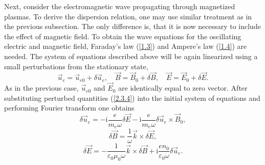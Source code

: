 Next, consider the electromagnetic wave propagating through magnetized plasmas. To derive the dispersion relation, one may use similar treatment as in the previous subsection. The only difference is, that it is now necessary to include the effect of magnetic field. To obtain the wave equations for the oscillating electric and magnetic field, Faraday's law (\ref{1.3}) and Ampere's law (\ref{1.4}) are needed. The system of equations described above will be again linearized using a small perturbations from the stationary state,
\begin{equation}
\label{2.3.4}
\vec{u}_{e} = \vec{u}_{e0} + \delta \vec{u}_{e}, \quad \vec{B} = \vec{B}_{0} + \delta \vec{B}, \quad \vec{E} = \vec{E}_{0} + \delta \vec{E}.
\end{equation}
As in the previous case, $ \vec{u}_{e0} $ and $ \vec{E}_{0} $ are identically equal to zero vector. After substituting perturbed quantities (\ref{2.3.4}) into the initial system of equations and performing Fourier transform one obtains
\begin{equation}
\label{2.3.6}
\delta \vec{u}_{e} = - \mathrm{i} \frac{e}{m_{e} \omega} \delta \vec{E} - \mathrm{i} \frac{e}{m_{e} \omega} \delta \vec{u}_{e} \times \vec{B}_{0},
\end{equation}
\begin{equation}
\label{2.3.7}
\delta \vec{B} = \frac{1}{\omega} \vec{k} \times \delta \vec{E},
\end{equation}
\begin{equation}
\label{2.3.8}
\delta \vec{E} = - \frac{1}{\varepsilon_{0} \mu_{0} \omega} \vec{k} \times \delta \vec{B} + \mathrm{i} \frac{e n_{0}}{\varepsilon_{0} \omega} \delta \vec{u}_{e}.
\end{equation}

